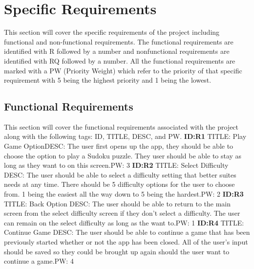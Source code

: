 \documentclass{article}
\begin{document}
 
\section{Specific Requirements}
This section will cover the specific requirements of the project including functional and non-functional requirements. The functional requirements are identified with R followed by a number and nonfunctional requirements are identified with RQ followed by a number. All the functional requirements are marked with a PW (Priority Weight) which refer to the priority of that specific requirement with 5 being the highest priority and 1 being the lowest.

 
\subsection{Functional Requirements}
This section will cover the functional requirements associated with the project along with the following tags: ID, TITLE, DESC, and PW. \newline \newline
\textbf{ID:R1} \newline TITLE: Play Game Option\newline DESC: The user first opens up the app, they should be able to choose the option to play a Sudoku puzzle. They user should be able to stay as long as they want to on this screen.\newline PW: 3 \newline \newline
\textbf{ID:R2} \newline TITLE: Select Difficulty \newline DESC: The user should be able to select a difficulty setting that better suites needs at any time. There should be 5 difficulty options for the user to choose from. 1 being the easiest all the way down to 5 being the hardest.\newline PW: 2 \newline \newline
\textbf{ID:R3} \newline TITLE: Back Option \newline DESC: The user should be able to return to the main screen from the select difficulty screen if they don't select a difficulty. The user can remain on the select difficulty as long as the want to.\newline PW: 1 \newline \newline
\textbf{ID:R4} \newline TITLE: Continue Game \newline DESC: The user should be able to continue a game that has been previously started whether or not the app has been closed. All of the user's input should be saved so they could be brought up again should the user want to continue a game.\newline PW: 4 \newline \newline
\end{document}
